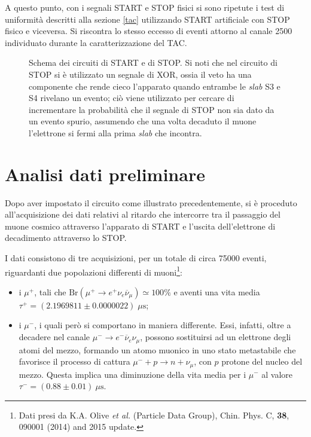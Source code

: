 \documentclass[10pt, oneside, a4paper]{article}   	%
\begin{document}
A questo punto, con i segnali START e STOP fisici si sono ripetute i test di uniformità descritti alla sezione \ref{tac} utilizzando START artificiale con STOP fisico e viceversa. Si riscontra lo stesso eccesso di eventi attorno al canale 2500 individuato durante la caratterizzazione del TAC.
%
\begin{figure}[h]
	\centering
	
	\caption{Schema dei circuiti di START e di STOP. Si noti che nel circuito di STOP si è utilizzato un segnale di XOR, ossia il veto ha una componente che rende cieco l'apparato quando entrambe le \emph{slab} S3 e S4 rivelano un evento; ciò viene utilizzato per cercare di incrementare la probabilità che il segnale di STOP non sia dato da un evento spurio, assumendo che una volta decaduto il muone l'elettrone si fermi alla prima \emph{slab} che incontra.}
	\label{scemi}
\end{figure}
%
\section{Analisi dati preliminare}
\label{analPrelim}
Dopo aver impostato il circuito come illustrato precedentemente, si è proceduto all'acquisizione dei dati relativi al ritardo che intercorre tra il passaggio del muone cosmico attraverso l'apparato di START e l'uscita dell'elettrone di decadimento attraverso lo STOP.

I dati consistono di tre acquisizioni, per un totale di circa 75000 eventi, riguardanti due popolazioni differenti di muoni\footnote{Dati presi da K.A. Olive \emph{et al.} (Particle Data Group), Chin. Phys. C, \textbf{38}, 090001 (2014) and 2015 update.}:
\begin{itemize}
	\item i $\mu^+$, tali che $\mbox{Br}(\mu^+ \to e^+\nu_e\overline{\nu}_\mu)\simeq 100 \%$ e aventi una vita media \linebreak $\tau^+=(2.1969811 \pm 0.0000022)\;\mu\mbox{s}$;
\item i $\mu^-$, i quali però si comportano in maniera differente. Essi, infatti, oltre a decadere nel canale $\mu^-\to e^-\overline{\nu}_e\nu_\mu$, possono sostituirsi ad un elettrone degli atomi del mezzo, formando un atomo muonico in uno stato metastabile che favorisce il processo di cattura $\mu^-+p\to n+\nu_\mu $, con $p$ protone del nucleo del mezzo. Questa implica una diminuzione della vita media per i $\mu^-$ al valore $\tau^-=(0.88 \pm 0.01) \ \mu \mbox{s}$.
\end{itemize}
\end{document}
